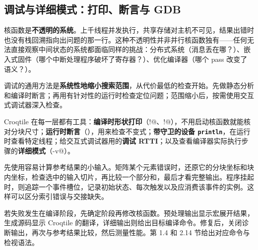 \subsection*{调试与详细模式：打印、断言与 GDB}

核函数是\textbf{不透明的系统}。上千线程并发执行，共享存储对主机不可见，结果出错时也没有栈回溯指向出问题的那一行。这种不透明性并非并行核函数独有——任何无法直接观察中间状态的系统都面临同样的挑战：分布式系统（消息丢在哪？）、嵌入式固件（哪个中断处理程序破坏了寄存器？）、优化编译器（哪个 pass 改变了语义？）。

调试的通用方法是\textbf{系统性地缩小搜索范围}，从代价最低的检查开始。先做静态分析和编译时断言；再用有针对性的运行时检查定位问题；范围缩小后，按需使用交互式调试器深入检查。

Croqtile 在每一层都有工具：\textbf{编译时形状打印}（\co@print!@、\co@println!@），不用启动核函数就能核对分块尺寸；\textbf{运行时断言}（\co@assert@），用来检查不变式；\textbf{带守卫的设备 \texttt{println}}，在运行时查看特定线程；给交互式调试器用的\textbf{调试 RTTI}；以及查看编译器实际执行步骤的\textbf{详细模式}（\co@-v@）。

先使用容易计算参考结果的小输入。矩阵某个元素错误时，还原它的分块坐标和块内坐标，检查选中的输入切片，再比较一个部分和，最后才看完整输出。程序挂起时，则追踪一个事件槽位，记录初始状态、每次触发以及应消费该事件的实例。这样可以区分索引错误与交接缺失。

若失败发生在编译阶段，先确定阶段再修改核函数。预处理输出显示宏展开结果，生成源码显示 Croqtile 的翻译，详细输出则给出目标编译命令。修复后，关闭诊断输出，再次与参考结果比较，然后测量性能。第 1.4 和 2.14 节给出对应命令与检视语法。
